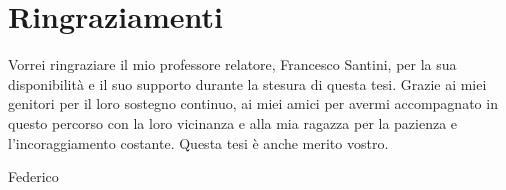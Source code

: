 \chapter*{Ringraziamenti}

Vorrei ringraziare il mio professore relatore, 
Francesco Santini, per la sua disponibilità e 
il suo supporto durante la stesura di questa tesi. 
Grazie ai miei genitori per il loro sostegno continuo, 
ai miei amici per avermi accompagnato 
in questo percorso con la loro vicinanza 
e alla mia ragazza per la pazienza e l’incoraggiamento costante. 
Questa tesi è anche merito vostro.

\vspace{17mm}

\vs
\begin{flushright}
 Federico
\end{flushright}

